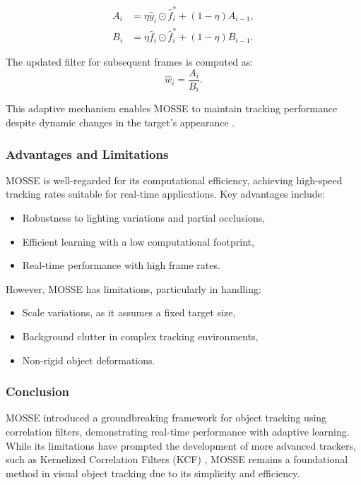 \begin{equation}
    \begin{aligned}
        A_i &= \eta \hat{y}_i \odot \hat{f}_i^* + (1 - \eta) A_{i-1}, \\
        B_i &= \eta \hat{f}_i \odot \hat{f}_i^* + (1 - \eta) B_{i-1}.
    \end{aligned}
\end{equation}

The updated filter for subsequent frames is computed as:
\begin{equation}
    \hat{w}_i = \frac{A_i}{B_i}.
\end{equation}

This adaptive mechanism enables MOSSE to maintain tracking performance despite dynamic changes in the target's appearance \cite{bolme2010visual}.

\subsubsection{Advantages and Limitations}
MOSSE is well-regarded for its computational efficiency, achieving high-speed tracking rates suitable for real-time applications. Key advantages include:
\begin{itemize}
    \item Robustness to lighting variations and partial occlusions,
    \item Efficient learning with a low computational footprint,
    \item Real-time performance with high frame rates.
\end{itemize}
However, MOSSE has limitations, particularly in handling:
\begin{itemize}
    \item Scale variations, as it assumes a fixed target size,
    \item Background clutter in complex tracking environments,
    \item Non-rigid object deformations.
\end{itemize}

\subsubsection{Conclusion}
MOSSE introduced a groundbreaking framework for object tracking using correlation filters, demonstrating real-time performance with adaptive learning. While its limitations have prompted the development of more advanced trackers, such as Kernelized Correlation Filters (KCF) \cite{henriques2014high}, MOSSE remains a foundational method in visual object tracking due to its simplicity and efficiency.



